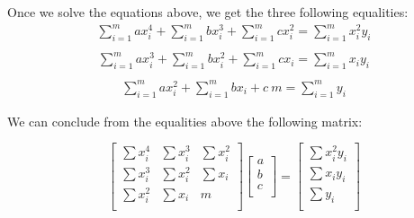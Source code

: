 \documentclass[]{report}
\begin{document}
				Once we solve the equations above, we get the three following equalities:
				\begin{equation}
					\begin{align}
		 				\sum_{i=1}^{m}ax_i^4 + \sum_{i=1}^{m}bx_i^3 + \sum_{i=1}^{m}cx_i^2 = \sum_{i=1}^{m}x_i^2y_i \\
					\end{align}
				\end{equation}
				\begin{equation}
					\begin{align}
		 				\sum_{i=1}^{m}ax_i^3 + \sum_{i=1}^{m}bx_i^2 + \sum_{i=1}^{m}cx_i = \sum_{i=1}^{m}x_iy_i\\
					\end{align}
				\end{equation}
				\begin{equation}
					\begin{align}
		 				 \sum_{i=1}^{m}ax_i^2 + \sum_{i=1}^{m}bx_i + c\ m = \sum_{i=1}^{m}y_i
					\end{align}
				\end{equation}
				
				We can conclude from the equalities above the following matrix:

				\begin{equation}
						\begin{bmatrix}
						\sum x_i^4 & \sum x_i^3 & \sum x_i^2 \\
						\sum x_i^3 & \sum x_i^2 & \sum x_i \\
						\sum x_i^2 & \sum x_i & m \\
						\end{bmatrix}
						\begin{bmatrix}
						a \\
						b \\
						c \\
						\end{bmatrix}
						=
						\begin{bmatrix}
						\sum x_i^2y_i \\
						\sum x_iy_i \\
						\sum y_i \\
						\end{bmatrix}
				\end{equation}
				
\end{document}

